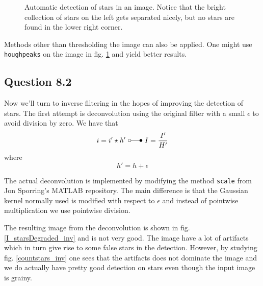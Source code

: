 \documentclass[a4paper, 10pt, final]{article}
\begin{document}
\begin{figure}[!h]
    \caption[]{Automatic detection of stars in an image. Notice that the
    bright collection of stars on the left gets separated nicely, but no
    stars are found in the lower right corner.}
    \label{countstars_org}
\end{figure}

Methods other than thresholding the image can also be applied. One might
use \texttt{houghpeaks} on the image in fig. \ref{countstars_org} and
yield better results.

\subsection*{Question 8.2}
Now we'll turn to inverse filtering in the hopes of improving the
detection of stars. The first attempt is deconvolution using the
original filter with a small $\epsilon$ to avoid division by zero. We
have that
\begin{equation}
    i = i' \star h' ~\laplace~ I = \frac{I'}{H'}
\end{equation}
where
\begin{equation}
    h' = h + \epsilon
\end{equation}

The actual deconvolution is implemented by modifying the
method \texttt{scale} from Jon Sporring's MATLAB repository. The main
difference is that the Gaussian kernel normally used is modified with
respect to $\epsilon$ and instead of pointwise multiplication we use
pointwise division.

The resulting image from the deconvolution is shown in fig.
\ref{I_starsDegraded_inv} and is not very good. The image have a lot of
artifacts which in turn give rise to some false stars in the detection.
However, by studying fig. \ref{countstars_inv} one sees that the
artifacts does not dominate the image and we do actually have pretty
good detection on stars even though the input image is grainy.
\end{document}
